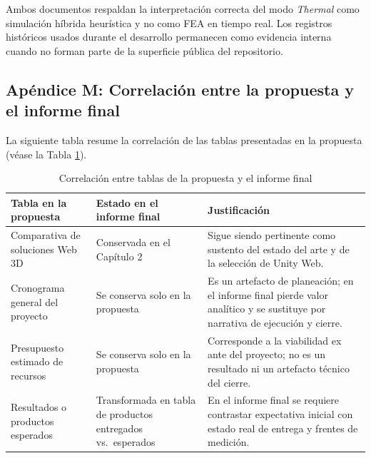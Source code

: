 \noindent Ambos documentos respaldan la interpretación correcta del modo \textit{Thermal} como simulación híbrida heurística y no como FEA en tiempo real. Los registros históricos usados durante el desarrollo permanecen como evidencia interna cuando no forman parte de la superficie pública del repositorio.

\subsection*{Apéndice M: Correlación entre la propuesta y el informe final}

La siguiente tabla resume la correlación de las tablas presentadas en la propuesta (véase la Tabla \ref{tab:correlacion_tablas_propuesta_informe}).

\begin{table}[H]
    \caption{Correlación entre tablas de la propuesta y el informe final}
    \label{tab:correlacion_tablas_propuesta_informe}
    \centering
    \scriptsize\singlespacing
    \begin{tabular}{p{4.1cm}p{3.6cm}p{4.8cm}}
        \hline
        \textbf{Tabla en la propuesta} & \textbf{Estado en el informe final} & \textbf{Justificación} \\ \hline
        Comparativa de soluciones Web 3D & Conservada en el Capítulo 2 & Sigue siendo pertinente como sustento del estado del arte y de la selección de Unity Web. \\
        Cronograma general del proyecto & Se conserva solo en la propuesta & Es un artefacto de planeación; en el informe final pierde valor analítico y se sustituye por narrativa de ejecución y cierre. \\
        Presupuesto estimado de recursos & Se conserva solo en la propuesta & Corresponde a la viabilidad ex ante del proyecto; no es un resultado ni un artefacto técnico del cierre. \\
        Resultados o productos esperados & Transformada en tabla de productos entregados vs.\ esperados & En el informe final se requiere contrastar expectativa inicial con estado real de entrega y frentes de medición. \\ \hline
    \end{tabular}
    \par\vspace{0.5\baselineskip}
\end{table}

